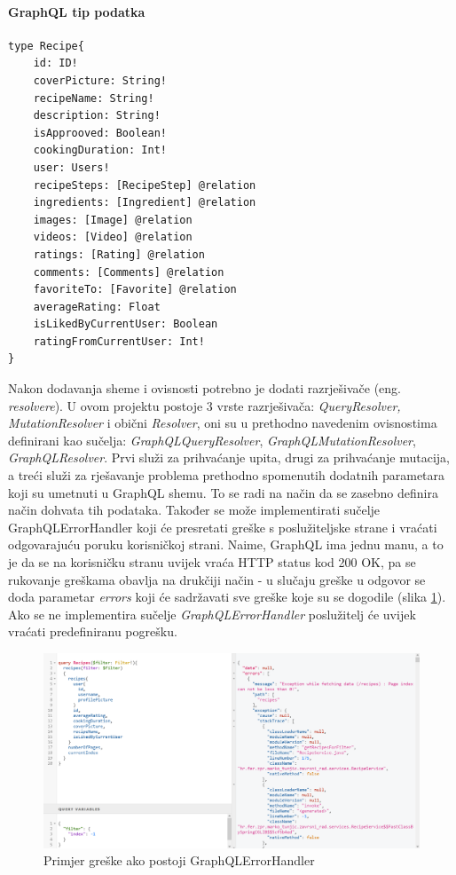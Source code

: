 \documentclass[times, utf8, zavrsni]{fer}
\begin{document}
\paragraph{GraphQL tip podatka}
\label{graphqlType}
\begin{Verbatim}[fontsize=\scriptsize]
type Recipe{
    id: ID!
    coverPicture: String!
    recipeName: String!
    description: String!
    isApprooved: Boolean!
    cookingDuration: Int!
    user: Users!
    recipeSteps: [RecipeStep] @relation
    ingredients: [Ingredient] @relation
    images: [Image] @relation
    videos: [Video] @relation
    ratings: [Rating] @relation
    comments: [Comments] @relation
    favoriteTo: [Favorite] @relation
    averageRating: Float
    isLikedByCurrentUser: Boolean
    ratingFromCurrentUser: Int!
}
\end{Verbatim}
Nakon dodavanja sheme i ovisnosti potrebno je dodati razrješivače (eng. \textit{resolvere}). U ovom projektu postoje 3 vrste razrješivača:
\textit{QueryResolver, MutationResolver} i obični \textit{Resolver}, oni su u prethodno navedenim ovisnostima definirani kao sučelja:
\textit{GraphQLQueryResolver}, \textit{GraphQLMutationResolver}, \textit{GraphQLResolver}. Prvi služi za prihvaćanje upita, drugi za prihvaćanje
mutacija, a treći služi za rješavanje problema prethodno spomenutih dodatnih parametara koji su umetnuti u GraphQL shemu. To se radi
na način da se zasebno definira način dohvata tih podataka. Također se može implementirati sučelje GraphQLErrorHandler koji
će presretati greške s poslužiteljske strane i vraćati odgovarajuću poruku korisničkoj strani. Naime, GraphQL
ima jednu manu, a to je da se na korisničku stranu uvijek vraća HTTP status kod 200 OK, pa se rukovanje greškama
obavlja na drukčiji način - u slučaju greške u odgovor se doda parametar \textit{errors} koji će sadržavati
sve greške koje su se dogodile (slika \ref{fig:Handled error}).
Ako se ne implementira sučelje \textit{GraphQLErrorHandler} poslužitelj će uvijek vraćati predefiniranu pogrešku. \\
\begin{figure}[h]
      \includegraphics[width=\textwidth]{graphql_handled_error.png}
      \caption{Primjer greške ako postoji GraphQLErrorHandler}
      \label{fig:Handled error}
\end{figure}
\end{document}
